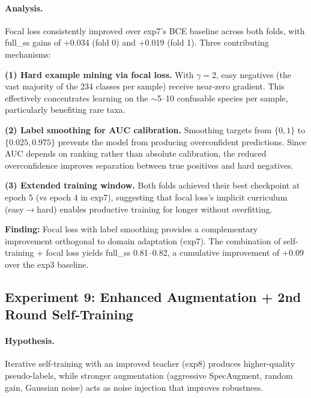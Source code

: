 \paragraph{Analysis.}
Focal loss consistently improved over exp7's BCE baseline across both folds,
with full\_ss gains of +0.034 (fold 0) and +0.019 (fold 1).
Three contributing mechanisms:

\textbf{(1) Hard example mining via focal loss.}
With $\gamma=2$, easy negatives (the vast majority of the 234 classes per sample)
receive near-zero gradient. This effectively concentrates learning on the
$\sim$5--10 confusable species per sample, particularly benefiting rare taxa.

\textbf{(2) Label smoothing for AUC calibration.}
Smoothing targets from $\{0,1\}$ to $\{0.025, 0.975\}$ prevents the model from
producing overconfident predictions. Since AUC depends on ranking rather than
absolute calibration, the reduced overconfidence improves separation between
true positives and hard negatives.

\textbf{(3) Extended training window.}
Both folds achieved their best checkpoint at epoch 5 (vs epoch 4 in exp7),
suggesting that focal loss's implicit curriculum (easy$\to$hard) enables
productive training for longer without overfitting.

\textbf{Finding:} Focal loss with label smoothing provides a complementary
improvement orthogonal to domain adaptation (exp7). The combination of
self-training + focal loss yields full\_ss 0.81--0.82, a cumulative
improvement of $+0.09$ over the exp3 baseline.

\subsection{Experiment 9: Enhanced Augmentation + 2nd Round Self-Training}
\label{sec:exp9}

\paragraph{Hypothesis.}
Iterative self-training with an improved teacher (exp8) produces higher-quality
pseudo-labels, while stronger augmentation (aggressive SpecAugment, random gain,
Gaussian noise) acts as noise injection that improves robustness.

